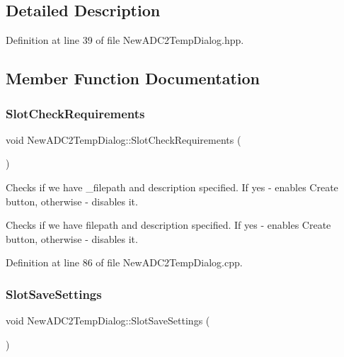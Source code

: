 \subsection{Detailed Description}


Definition at line 39 of file New\+A\+D\+C2\+Temp\+Dialog.\+hpp.



\subsection{Member Function Documentation}
\mbox{\label{class_new_a_d_c2_temp_dialog_afe68e82283f8cf518d6df9fafcea2a43}} 
\subsubsection{\texorpdfstring{Slot\+Check\+Requirements}{SlotCheckRequirements}}
{\footnotesize\ttfamily void New\+A\+D\+C2\+Temp\+Dialog\+::\+Slot\+Check\+Requirements (\begin{DoxyParamCaption}{ }\end{DoxyParamCaption})\hspace{0.3cm}{\ttfamily [slot]}}



Checks if we have \+\_\+filepath and description specified. If yes -\/ enables Create button, otherwise -\/ disables it. 

Checks if we have filepath and description specified. If yes -\/ enables Create button, otherwise -\/ disables it. 

Definition at line 86 of file New\+A\+D\+C2\+Temp\+Dialog.\+cpp.

\mbox{\label{class_new_a_d_c2_temp_dialog_a59b42efcbe03d9429250558eebaf6dd3}} 
\subsubsection{\texorpdfstring{Slot\+Save\+Settings}{SlotSaveSettings}}
{\footnotesize\ttfamily void New\+A\+D\+C2\+Temp\+Dialog\+::\+Slot\+Save\+Settings (\begin{DoxyParamCaption}{ }\end{DoxyParamCaption})\hspace{0.3cm}{\ttfamily [slot]}}



